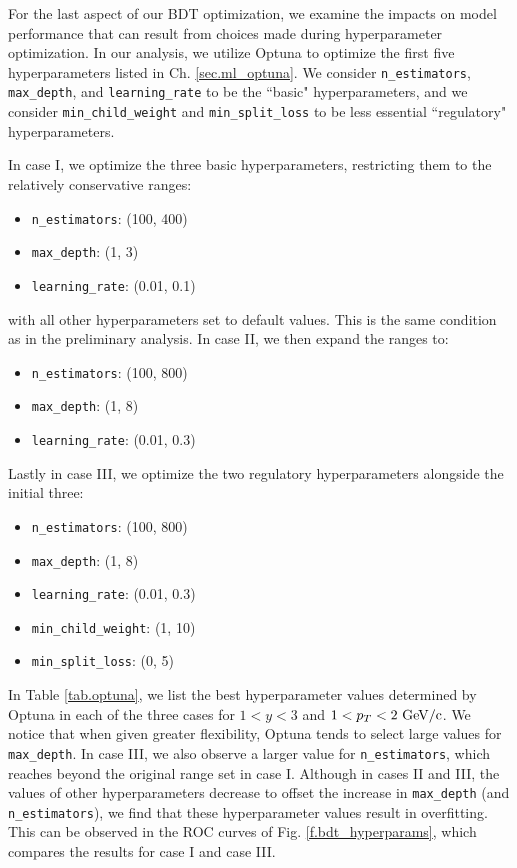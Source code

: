 For the last aspect of our BDT optimization, we examine the impacts on model performance that can result from choices made during hyperparameter optimization. In our analysis, we utilize Optuna \cite{Optuna} to optimize the first five hyperparameters listed in Ch. \ref{sec.ml_optuna}. We consider \texttt{n\_estimators}, \texttt{max\_depth}, and \texttt{learning\_rate} to be the ``basic" hyperparameters, and we consider \texttt{min\_child\_weight} and \texttt{min\_split\_loss} to be less essential ``regulatory" hyperparameters.

In case I, we optimize the three basic hyperparameters, restricting them to the relatively conservative ranges:
\begin{itemize}
    \item \texttt{n\_estimators}: (100, 400)
    \item \texttt{max\_depth}: (1, 3)
    \item \texttt{learning\_rate}: (0.01, 0.1)
\end{itemize}
with all other hyperparameters set to default values. This is the same condition as in the preliminary analysis. In case II, we then expand the ranges to:
\begin{itemize}
    \item \texttt{n\_estimators}: (100, 800)
    \item \texttt{max\_depth}: (1, 8)
    \item \texttt{learning\_rate}: (0.01, 0.3)
\end{itemize}
Lastly in case III, we optimize the two regulatory hyperparameters alongside the initial three:
\begin{itemize}
    \item \texttt{n\_estimators}: (100, 800)
    \item \texttt{max\_depth}: (1, 8)
    \item \texttt{learning\_rate}: (0.01, 0.3)
    \item \texttt{min\_child\_weight}: (1, 10)
    \item \texttt{min\_split\_loss}: (0, 5)
\end{itemize}

In Table \ref{tab.optuna}, we list the best hyperparameter values determined by Optuna in each of the three cases for $1<y<3$ and $1<p_T<2~{\rm GeV/c}$. We notice that when given greater flexibility, Optuna tends to select large values for \texttt{max\_depth}. In case III, we also observe a larger value for \texttt{n\_estimators}, which reaches beyond the original range set in case I. Although in cases II and III, the values of other hyperparameters decrease to offset the increase in \texttt{max\_depth} (and \texttt{n\_estimators}), we find that these hyperparameter values result in overfitting. This can be observed in the ROC curves of Fig. \ref{f.bdt_hyperparams}, which compares the results for case I and case III.

